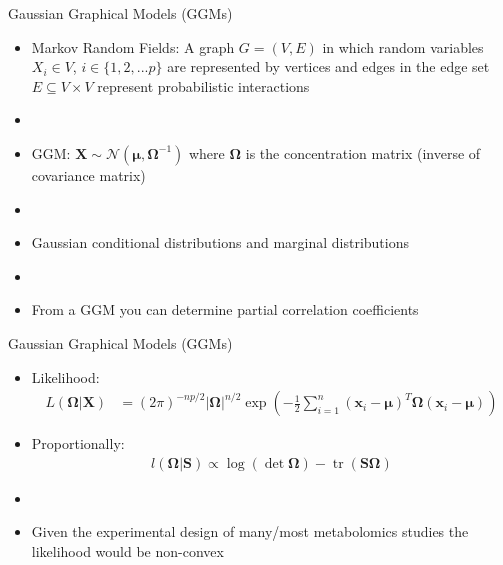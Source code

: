 \documentclass[xcolor=dvipsnames]{beamer}
\DeclareMathOperator{\tr}{tr}
\begin{document}
\begin{frame}{Gaussian Graphical Models (GGMs)}
	\vspace{-5.5pt}
	\begin{itemize}
		\item Markov Random Fields: A graph $G=(V,E)$ in which random variables $X_i\in V$, $i\in \{1,2,...p\}$ are represented by vertices and edges in the edge set $E \subseteq V \times V$ represent probabilistic interactions \pause
		\item[]
		\item GGM: $\textbf{X}\sim \mathcal{N}(\boldsymbol{\mu},\boldsymbol{\Omega}^{-1})$ where $\boldsymbol{\Omega}$ is the concentration matrix (inverse of covariance matrix) \pause
		\item[]
		\item Gaussian conditional distributions and marginal distributions \pause
		\item[]
		\item From a GGM you can determine partial correlation coefficients 
	\end{itemize}
\end{frame}

\begin{frame}{Gaussian Graphical Models (GGMs)}
	\vspace{-15.5pt}
	\begin{itemize}
		\item Likelihood:
		\begin{align*}
		L(\boldsymbol{\Omega}|\textbf{X})&=(2 \pi)^{-np/2}|\boldsymbol{\Omega}|^{n/2} \exp \left(-\frac{1}{2}\sum_{i=1}^{n} (\textbf{x}_i-\boldsymbol{\mu})^T \boldsymbol{\Omega} (\textbf{x}_i-\boldsymbol{\mu})\right) 
		\end{align*}\pause
		\item Proportionally:
		\begin{align*} 
		l(\boldsymbol{\Omega}|\textbf{S})\propto\log (\det \boldsymbol{\Omega})-\tr \left( \textbf{S} \boldsymbol{\Omega} \right)
		\end{align*}\pause
		\item[]
		\item Given the experimental design of many/most metabolomics studies the likelihood would be non-convex
	\end{itemize}
\end{frame}
\end{document}
